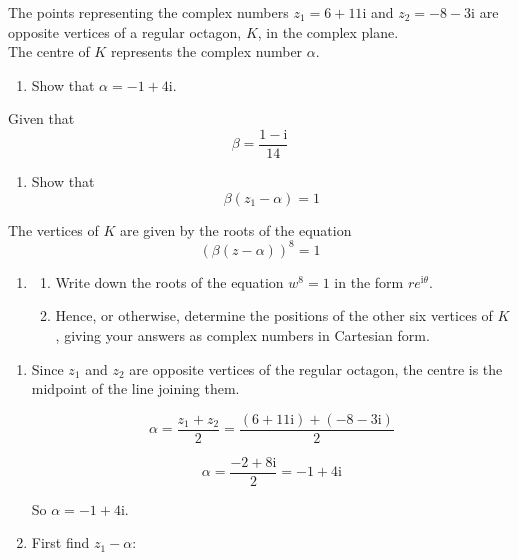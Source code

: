 \documentclass[leqno]{article}
\begin{document}
\begin{enumerate}[
  label=\textbf{\arabic*.},
  leftmargin=*,
  topsep=0pt,
  partopsep=0pt,
  parsep=0pt
]
The points representing the complex numbers $z_1=6+11\mathrm{i}$ and $z_2=-8-3\mathrm{i}$ are opposite vertices of a regular octagon, $K$, in the complex plane. \\
The centre of $K$ represents the complex number $\alpha$. \\
\begin{enumerate}[label=\textbf{(\alph*)}]
  \item Show that $\alpha=-1+4\mathrm{i}$.  \\
\end{enumerate}
Given that
\[
\beta=\frac{1-\mathrm{i}}{14}
\]
\begin{enumerate}[label=\textbf{(\alph*)}, resume]
  \item Show that
  \[
  \beta(z_1-\alpha)=1
  \]
\end{enumerate}
The vertices of $K$ are given by the roots of the equation
\[
(\beta(z-\alpha))^8=1
\]
\begin{enumerate}[label=\textbf{(\alph*)}, resume]
  \item
  \begin{enumerate}[label=(\roman*)]
    \item Write down the roots of the equation $w^8=1$ in the form $re^{\mathrm{i}\theta}$. 
    \item Hence, or otherwise, determine the positions of the other six vertices of $K$, giving your answers as complex numbers in Cartesian form.  \\
  \end{enumerate}
\end{enumerate}

\vspace*{30pt}

\begin{tcolorbox}[colback=white, colframe=scarlet, title={\textbf{Solution}}, breakable, grow to left by=6mm, grow to right by=10mm]
\begin{enumerate}[label=\textbf{(\alph*)}]
  \item Since $z_1$ and $z_2$ are opposite vertices of the regular octagon, the centre is the midpoint of the line joining them.

\[
\alpha=\frac{z_1+z_2}{2}
=\frac{(6+11\mathrm{i})+(-8-3\mathrm{i})}{2}
\]

\[
\alpha=\frac{-2+8\mathrm{i}}{2}=-1+4\mathrm{i}
\]

So $\alpha=-1+4\mathrm{i}$.

  \item First find $z_1-\alpha$:


\end{enumerate}
\end{tcolorbox}
\end{enumerate}
\end{document}
